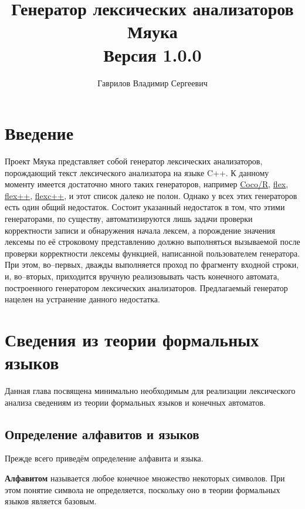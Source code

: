 \documentclass[10pt]{report}
\begin{document}
\unitlength=5mm

\author{Гаврилов Владимир Сергеевич}
\title{Генератор лексических анализаторов Мяука\\ Версия 1.0.0}
\maketitle

    \tableofcontents


\chapter*{Введение}
Проект Мяука представляет собой генератор лексических анализаторов, порождающий текст лексического анализатора на языке C++. К данному моменту имеется достаточно много таких генераторов, например \href{http://www.ssw.uni-linz.ac.at/Coco}{Coco/R}, \href{http://flex.sourceforge.net}{flex}, \href{http://www.mario-konrad.ch/wiki/doku.php?id=programming:flexbison:flexppbisonpp}{flex++}, \href{http://flexcpp.sourceforge.net}{flexc++}, и этот список далеко не полон. Однако у всех этих генераторов есть один общий недостаток. Состоит указанный недостаток в том, что этими генераторами, по существу, автоматизируются лишь задачи проверки корректности записи и обнаружения начала лексем, а порождение значения лексемы по её строковому представлению должно выполняться вызываемой после проверки корректности лексемы функцией, написанной пользователем генератора. При этом, во–первых, дважды выполняется проход по фрагменту входной строки, и, во–вторых, приходится вручную реализовывать часть конечного автомата, построенного генератором лексических анализаторов. Предлагаемый генератор нацелен на устранение данного недостатка.

\chapter{Сведения из теории формальных языков}
Данная глава посвящена минимально необходимым для реализации лексического анализа сведениям из теории формальных языков и конечных автоматов.
\section{Определение алфавитов и языков}
Прежде всего приведём определение алфавита и языка.

\textbf{Алфавитом} называется любое конечное множество некоторых символов. При этом понятие символа не определяется, поскольку оно в теории формальных языков является базовым.
\end{document}
